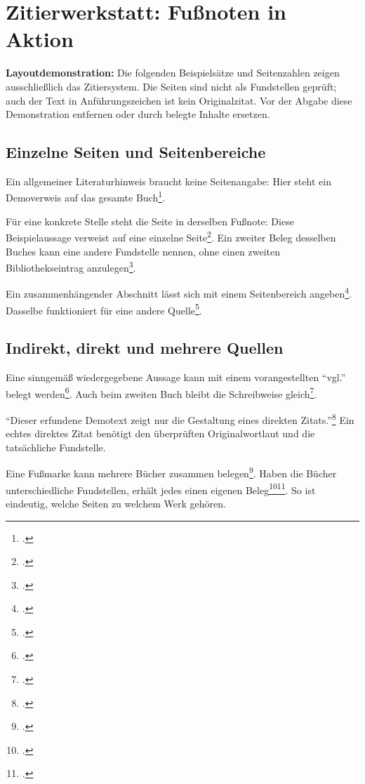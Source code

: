 \documentclass[12pt,a4paper,ngerman]{scrartcl}
\theoremstyle{definition}
\begin{document}
\clearpage
\section{Zitierwerkstatt: Fußnoten in Aktion}
\label{sec:zitierdemo}
\textbf{Layoutdemonstration:} Die folgenden Beispielsätze und Seitenzahlen
zeigen ausschließlich das Zitiersystem. Die Seiten sind nicht als Fundstellen
geprüft; auch der Text in Anführungszeichen ist kein Originalzitat.
Vor der Abgabe diese Demonstration entfernen oder durch belegte Inhalte ersetzen.

\subsection{Einzelne Seiten und Seitenbereiche}
Ein allgemeiner Literaturhinweis braucht keine Seitenangabe: Hier steht ein
Demoverweis auf das gesamte Buch\footcite{polya1945}.

Für eine konkrete Stelle steht die Seite in derselben Fußnote: Diese
Beispielaussage verweist auf eine einzelne Seite\footcite[S.~23]{polya1945}.
Ein zweiter Beleg desselben Buches kann eine andere Fundstelle nennen,
ohne einen zweiten Bibliothekseintrag anzulegen\footcite[S.~42]{polya1945}.

Ein zusammenhängender Abschnitt lässt sich mit einem Seitenbereich
angeben\footcite[S.~23--25]{polya1945}. Dasselbe funktioniert für eine
andere Quelle\footcite[S.~10--12]{spivak2008}.

\subsection{Indirekt, direkt und mehrere Quellen}
Eine sinngemäß wiedergegebene Aussage kann mit einem vorangestellten
\enquote{vgl.} belegt werden\footcite[vgl.][S.~23--25]{polya1945}.
Auch beim zweiten Buch bleibt die Schreibweise gleich\footcite[vgl.][S.~15]{spivak2008}.

\enquote{Dieser erfundene Demotext zeigt nur die Gestaltung eines direkten
Zitats.}\footcite[S.~23]{polya1945}
Ein echtes direktes Zitat benötigt den überprüften Originalwortlaut und die
tatsächliche Fundstelle.

Eine Fußmarke kann mehrere Bücher zusammen belegen\footcite{polya1945,spivak2008}.
Haben die Bücher unterschiedliche Fundstellen, erhält jedes einen eigenen
Beleg\footcite[S.~23]{polya1945}\footcite[S.~10--12]{spivak2008}.
So ist eindeutig, welche Seiten zu welchem Werk gehören.
\end{document}
